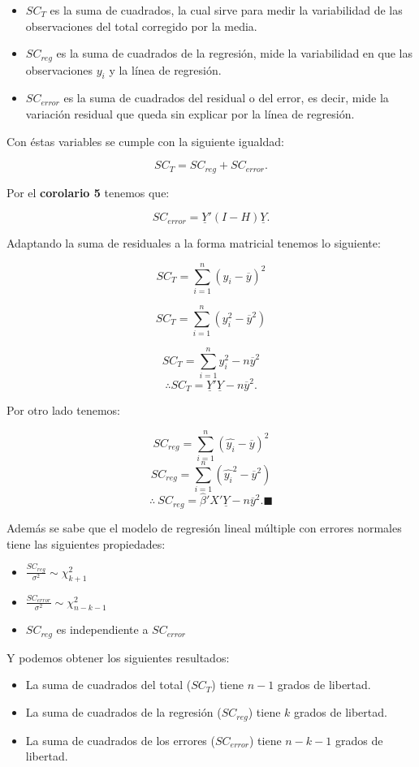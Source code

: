 \documentclass[
  a4paper,
  oneside,
  openany]{book}
\begin{document}
\begin{itemize}
\item
  \(SC_{T}\) es la suma de cuadrados, la cual sirve para medir la variabilidad de las observaciones del total corregido por la media.
\item
  \(SC_{reg}\) es la suma de cuadrados de la regresión, mide la variabilidad en que las observaciones \(y_{i}\) y la línea de regresión.
\item
  \(SC_{error}\) es la suma de cuadrados del residual o del error, es decir, mide la variación residual que queda sin explicar por la línea de regresión.
\end{itemize}

Con éstas variables se cumple con la siguiente igualdad:

\[SC_{T}=SC_{reg}+SC_{error}.\]

Por el \textbf{corolario 5} tenemos que:

\[SC_{error}=\underline{Y}'(I-H)\underline{Y}.\]

Adaptando la suma de residuales a la forma matricial tenemos lo siguiente:

\[SC_{T}=\sum_{i=1}^{n}(y_{i}-\overline{y})^2\]

\[SC_{T}=\sum_{i=1}^{n}(y_{i}^2-\overline{y}^2)\]

\[SC_{T}=\sum_{i=1}^{n}y_{i}^2-n\overline{y}^2\]
\[\therefore SC_{T}=\underline{Y}'\underline{Y}-n\overline{y}^2.\]

Por otro lado tenemos:

\[SC_{reg}=\sum_{i=1}^{n}(\hat{y_{i}}-\overline{y})^2\]
\[SC_{reg}=\sum_{i=1}^{n}(\hat{y_{i}}^2-\overline{y}^2)\]
\[\therefore \  SC_{reg}=\hat{\beta}'X'\underline{Y}-n\overline{y}^2. \blacksquare \]

Además se sabe que el modelo de regresión lineal múltiple con errores normales tiene las siguientes propiedades:

\begin{itemize}
\item
  \(\frac{SC_{reg}}{\sigma^2} \sim \chi^2_{k+1}\)
\item
  \(\frac{SC_{error}}{\sigma^2} \sim \chi^2_{n-k-1}\)
\item
  \(SC_{reg}\) es independiente a \(SC_{error}\)
\end{itemize}

Y podemos obtener los siguientes resultados:

\begin{itemize}
\item
  La suma de cuadrados del total (\(SC_{T}\)) tiene \(n-1\) grados de libertad.
\item
  La suma de cuadrados de la regresión (\(SC_{reg}\)) tiene \(k\) grados de libertad.
\item
  La suma de cuadrados de los errores (\(SC_{error}\)) tiene \(n-k-1\) grados de libertad.
\end{itemize}
\end{document}
